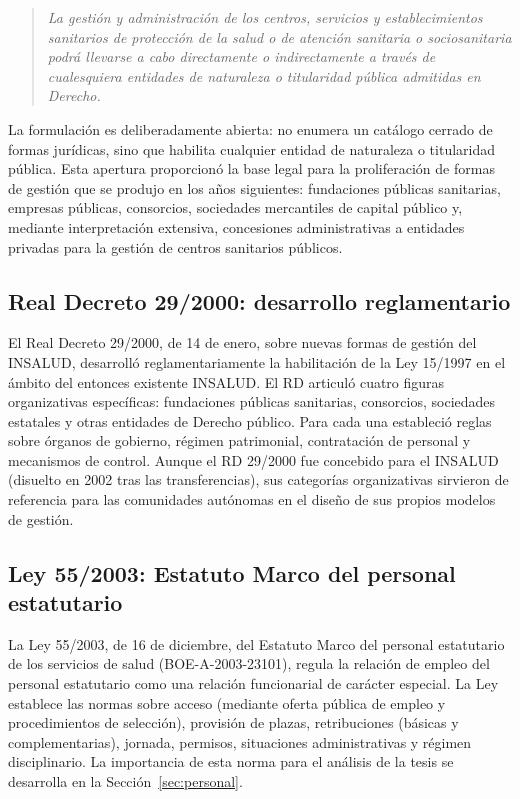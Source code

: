 \begin{quote}
\textit{La gestión y administración de los centros, servicios y establecimientos sanitarios de protección de la salud o de atención sanitaria o sociosanitaria podrá llevarse a cabo directamente o indirectamente a través de cualesquiera entidades de naturaleza o titularidad pública admitidas en Derecho.}
\end{quote}

La formulación es deliberadamente abierta: no enumera un catálogo cerrado de formas jurídicas, sino que habilita cualquier entidad de naturaleza o titularidad pública. Esta apertura proporcionó la base legal para la proliferación de formas de gestión que se produjo en los años siguientes: fundaciones públicas sanitarias, empresas públicas, consorcios, sociedades mercantiles de capital público y, mediante interpretación extensiva, concesiones administrativas a entidades privadas para la gestión de centros sanitarios públicos.

\subsection{Real Decreto 29/2000: desarrollo reglamentario}

El Real Decreto 29/2000, de 14 de enero, sobre nuevas formas de gestión del INSALUD, desarrolló reglamentariamente la habilitación de la Ley 15/1997 en el ámbito del entonces existente INSALUD. El RD articuló cuatro figuras organizativas específicas: fundaciones públicas sanitarias, consorcios, sociedades estatales y otras entidades de Derecho público. Para cada una estableció reglas sobre órganos de gobierno, régimen patrimonial, contratación de personal y mecanismos de control. Aunque el RD 29/2000 fue concebido para el INSALUD (disuelto en 2002 tras las transferencias), sus categorías organizativas sirvieron de referencia para las comunidades autónomas en el diseño de sus propios modelos de gestión.

\subsection{Ley 55/2003: Estatuto Marco del personal estatutario}

La Ley 55/2003, de 16 de diciembre, del Estatuto Marco del personal estatutario de los servicios de salud (BOE-A-2003-23101), regula la relación de empleo del personal estatutario como una relación funcionarial de carácter especial. La Ley establece las normas sobre acceso (mediante oferta pública de empleo y procedimientos de selección), provisión de plazas, retribuciones (básicas y complementarias), jornada, permisos, situaciones administrativas y régimen disciplinario. La importancia de esta norma para el análisis de la tesis se desarrolla en la Sección~\ref{sec:personal}.

